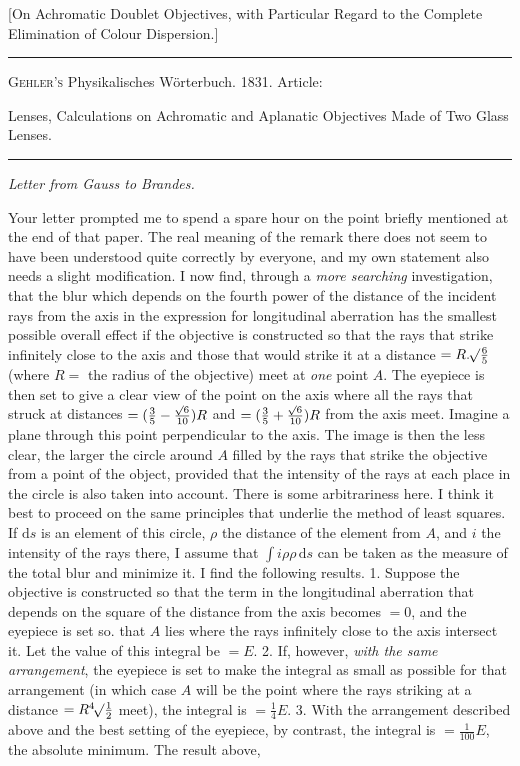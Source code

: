 \expandafter\def\csname HistoricalNoteText515\endcsname{[On Achromatic Doublet Objectives, with Particular Regard to the Complete Elimination of Colour Dispersion.]}
\begin{center}
\hrule\vspace{2mm}
\textsc{Gehler's} Physikalisches Wörterbuch. 1831. Article:\par
Lenses, Calculations on Achromatic and Aplanatic Objectives Made of Two Glass Lenses.
\vspace{2mm}\hrule\vspace{5mm}
{\large\itshape Letter from Gauss to Brandes.\par}
\end{center}
Your letter prompted me to spend a spare hour on the point briefly mentioned at the end of that paper. The real meaning of the remark there does not seem to have been understood quite correctly by everyone, and my own statement also needs a slight modification. I now find, through a \textit{more searching} investigation, that the blur which depends on the fourth power of the distance of the incident rays from the axis in the expression for longitudinal aberration has the smallest possible overall effect if the objective is constructed so that the rays that strike infinitely close to the axis and those that would strike it at a distance $=R.\BareRoot{\tfrac65}$ (where $R=$ the radius of the objective) meet at \textit{one} point $A$. The eyepiece is then set to give a clear view of the point on the axis where all the rays that struck at distances $=(\tfrac35-\tfrac{\BareRoot{6}}{10})R$ and $=(\tfrac35+\tfrac{\BareRoot{6}}{10})R$ from the axis meet. Imagine a plane through this point perpendicular to the axis. The image is then the less clear, the larger the circle around $A$ filled by the rays that strike the objective from a point of the object, provided that the intensity of the rays at each place in the circle is also taken into account. There is some arbitrariness here. I think it best to proceed on the same principles that underlie the method of least squares. If $\mathrm{d}s$ is an element of this circle, $\rho$ the distance of the element from $A$, and $i$ the intensity of the rays there, I assume that $\int i\rho\rho\,\mathrm{d}s$ can be taken as the measure of the total blur and minimize it. I find the following results. 1. Suppose the objective is constructed so that the term in the longitudinal aberration that depends on the square of the distance from the axis becomes $=0$, and the eyepiece is set so. that $A$ lies where the rays infinitely close to the axis intersect it. Let the value of this integral be $=E$. 2. If, however, \textit{with the same arrangement}, the eyepiece is set to make the integral as small as possible for that arrangement (in which case $A$ will be the point where the rays striking at a distance $=R\BareRoot[4]{\tfrac12}$ meet), the integral is $=\tfrac14E$. 3. With the arrangement described above and the best setting of the eyepiece, by contrast, the integral is $=\tfrac{1}{100}E$, the absolute minimum. The result above, 